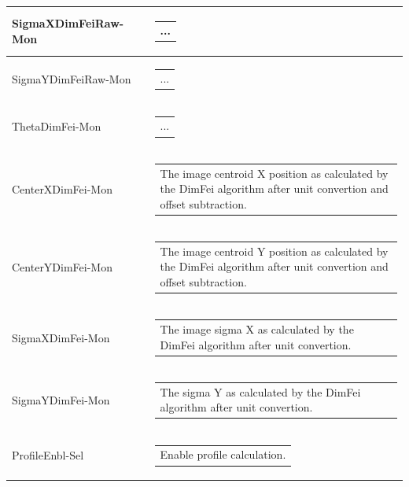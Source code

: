 \documentclass[openany]{article}
\begin{document}
\begin{longtable}{| m{3.0cm} m{4.5cm} m{7.0cm} |}
        SigmaXDimFeiRaw-Mon &  & \begin{tabular}{@{}m{6cm}@{}}
                ...
            \end{tabular} \hypertarget{}{}\\ \hline
        SigmaYDimFeiRaw-Mon &  & \begin{tabular}{@{}m{6cm}@{}}
                ...
            \end{tabular} \hypertarget{}{}\\ \hline
        ThetaDimFei-Mon &  & \begin{tabular}{@{}m{6cm}@{}}
                ...
            \end{tabular} \hypertarget{}{}\\ \hline
        CenterXDimFei-Mon &  & \begin{tabular}{@{}m{6cm}@{}}
                The image centroid X position as calculated by the DimFei algorithm
                after unit convertion and offset subtraction.
            \end{tabular} \hypertarget{}{}\\ \hline
        CenterYDimFei-Mon &  & \begin{tabular}{@{}m{6cm}@{}}
                The image centroid Y position as calculated by the DimFei algorithm
                after unit convertion and offset subtraction.
            \end{tabular} \hypertarget{}{}\\ \hline
        SigmaXDimFei-Mon &  & \begin{tabular}{@{}m{6cm}@{}}
                The image sigma X as calculated by the DimFei algorithm after unit
                convertion.
            \end{tabular} \hypertarget{}{}\\ \hline
        SigmaYDimFei-Mon &  & \begin{tabular}{@{}m{6cm}@{}}
               The sigma Y as calculated by the DimFei algorithm after unit convertion.
            \end{tabular} \hypertarget{}{}\\ \hline
        ProfileEnbl-Sel &  & \begin{tabular}{@{}m{6cm}@{}}
               Enable profile calculation.
            \end{tabular} \\ \hline

\end{longtable}
\end{document}
